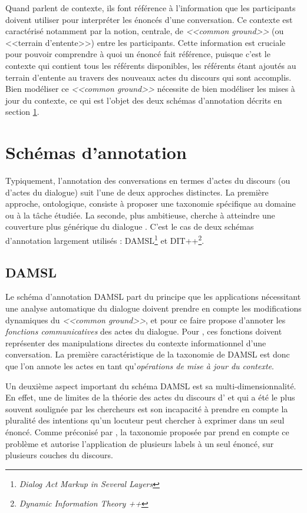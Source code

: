 \documentclass[10pt,a4paper,twoside]{article}
\begin{document}
Quand \citeauthor{poesio1997conversational} parlent de contexte, ils font référence à l'information que les participants doivent utiliser pour interpréter les énoncés d'une conversation. Ce contexte est caractérisé notamment par la notion, centrale, de \textit{<<common ground>>} (ou <<terrain d'entente>>) entre les participants. Cette information est cruciale pour pouvoir comprendre à quoi un énoncé fait référence, puisque c'est le contexte qui contient tous les référents disponibles, les référents étant ajoutés au terrain d'entente au travers des nouveaux actes du discours qui sont accomplis. Bien modéliser ce \textit{<<common ground>>} nécessite de bien modéliser les mises à jour du contexte, ce qui est l'objet des deux schémas d'annotation décrits en section \ref{sec:annotation_schemes}.

\section{Schémas d'annotation}
\label{sec:annotation_schemes}

Typiquement, l'annotation des conversations en termes d'actes du discours (ou d'actes du dialogue) suit l'une de deux approches distinctes. La première approche, ontologique, consiste à proposer une taxonomie spécifique au domaine ou à la tâche étudiée. La seconde, plus ambitieuse, cherche à atteindre une couverture plus générique du dialogue \cite{leech2003generic}. C'est le cas de deux schémas d'annotation largement utilisés : DAMSL\footnote{\textit{Dialog Act Markup in Several Layers}} et DIT++\footnote{\textit{Dynamic Information Theory ++}}.

\subsection{DAMSL}
\label{subsec:DAMSL}

Le schéma d'annotation DAMSL part du principe que les applications nécessitant une analyse automatique du dialogue doivent prendre en compte les modifications dynamiques du \textit{<<common ground>>}, et pour ce faire propose d'annoter les \textit{fonctions communicatives} des actes du dialogue. Pour \citet{core1997coding}, ces fonctions doivent représenter des manipulations directes du contexte informationnel d'une conversation. La première caractéristique de la taxonomie de DAMSL est donc que l'on annote les actes en tant qu'\textit{opérations de mise à jour du contexte}.

Un deuxième aspect important du schéma DAMSL est sa multi-dimensionnalité. En effet, une de limites de la théorie des actes du discours d'\citeauthor{austin1975how} et \citeauthor{searle1969speech} qui a été le plus souvent soulignée par les chercheurs est son incapacité à prendre en compte la pluralité des intentions qu'un locuteur peut chercher à exprimer dans un seul énoncé. Comme préconisé par \citet{traum1992conversation}, la taxonomie proposée par \citeauthor{core1997coding} prend en compte ce problème et autorise l'application de plusieurs labels à un seul énoncé, sur plusieurs couches du discours.
\end{document}
